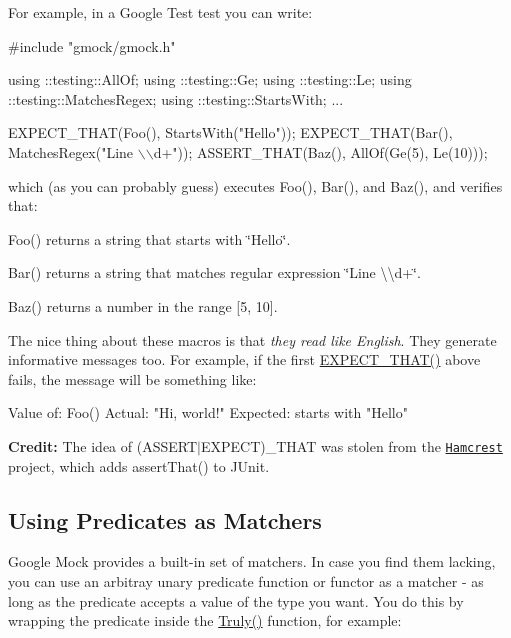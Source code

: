 For example, in a Google Test test you can write\+:


\begin{DoxyCode}
#include "gmock/gmock.h"

using ::testing::AllOf;
using ::testing::Ge;
using ::testing::Le;
using ::testing::MatchesRegex;
using ::testing::StartsWith;
...

  EXPECT\_THAT(Foo(), StartsWith("Hello"));
  EXPECT\_THAT(Bar(), MatchesRegex("Line \(\backslash\)\(\backslash\)d+"));
  ASSERT\_THAT(Baz(), AllOf(Ge(5), Le(10)));
\end{DoxyCode}


which (as you can probably guess) executes {\ttfamily Foo()}, {\ttfamily Bar()}, and {\ttfamily Baz()}, and verifies that\+:


\begin{DoxyItemize}
\item {\ttfamily Foo()} returns a string that starts with {\ttfamily \char`\"{}\+Hello\char`\"{}}.
\item {\ttfamily Bar()} returns a string that matches regular expression {\ttfamily \char`\"{}\+Line \textbackslash{}\textbackslash{}d+\char`\"{}}.
\item {\ttfamily Baz()} returns a number in the range \mbox{[}5, 10\mbox{]}.
\end{DoxyItemize}

The nice thing about these macros is that {\itshape they read like English}. They generate informative messages too. For example, if the first {\ttfamily \hyperlink{gmock-matchers_8h_ac31e206123aa702e1152bb2735b31409}{E\+X\+P\+E\+C\+T\+\_\+\+T\+H\+A\+T()}} above fails, the message will be something like\+:


\begin{DoxyCode}
Value of: Foo()
  Actual: "Hi, world!"
Expected: starts with "Hello"
\end{DoxyCode}


{\bfseries Credit\+:} The idea of {\ttfamily (A\+S\+S\+E\+R\+T$\vert$\+E\+X\+P\+E\+CT)\+\_\+\+T\+H\+AT} was stolen from the \href{http://code.google.com/p/hamcrest/}{\tt Hamcrest} project, which adds {\ttfamily assert\+That()} to J\+Unit.

\subsection*{Using Predicates as Matchers}

Google Mock provides a built-\/in set of matchers. In case you find them lacking, you can use an arbitray unary predicate function or functor as a matcher -\/ as long as the predicate accepts a value of the type you want. You do this by wrapping the predicate inside the {\ttfamily \hyperlink{namespacetesting_a5faf05cfaae6074439960048e478b1c8}{Truly()}} function, for example\+:


